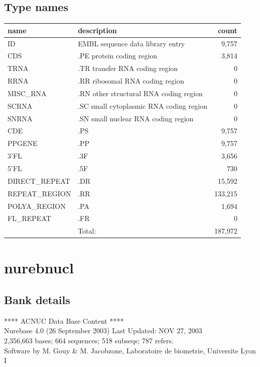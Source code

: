 \documentclass{article}
\begin{document}
\begin{Schunk}
\subsection{Type names}
\noindent\begin{tabular}{llr}
\hline \hline
name & description & count \\
\hline
ID  &  EMBL sequence data library entry  &  9,757 \\
CDS  &  .PE protein coding region  &  3,814 \\
TRNA  &  .TR transfer RNA coding region  &  0 \\
RRNA  &  .RR ribosomal RNA coding region  &  0 \\
MISC\_RNA  &  .RN other structural RNA coding region  &  0 \\
SCRNA  &  .SC small cytoplasmic RNA coding region  &  0 \\
SNRNA  &  .SN small nuclear RNA coding region  &  0 \\
CDE  &  .PS  &  9,757 \\
PPGENE  &  .PP  &  9,757 \\
3'FL  &  .3F  &  3,656 \\
5'FL  &  .5F  &  730 \\
DIRECT\_REPEAT  &  .DR  &  15,592 \\
REPEAT\_REGION  &  .RR  &  133,215 \\
POLYA\_REGION  &  .PA  &  1,694 \\
FL\_REPEAT  &  .FR  &  0 \\
\hline
 & Total: & 187,972 \\
\hline \hline
\end{tabular}

\section{ nurebnucl }
\subsection{Bank details}
             ****     ACNUC Data Base Content      ****                         \\
         Nurebase 4.0 (26 September 2003) Last Updated: NOV 27, 2003\\
2,356,663 bases; 664 sequences; 518 subseqs; 787 refers.\\
Software by M. Gouy \& M. Jacobzone, Laboratoire de biometrie, Universite Lyon I 


\end{Schunk}
\end{document}
